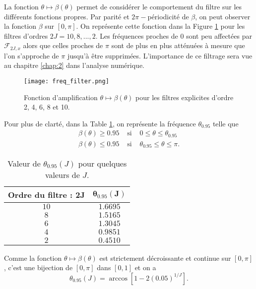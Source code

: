 La fonction $\theta \mapsto \beta(\theta)$ permet de considérer le comportement du filtre sur les différents fonctions propres. Par parité et $2 \pi -$périodicité de $\beta$, on peut observer la fonction $\beta$ sur $[0,\pi]$. On représente cette fonction dans la Figure \ref{fig:freq_filter} pour les filtres d'ordres $2J = 10, 8, ..., 2$. Les fréquences proches de 0 sont peu affectées par $\mathcal{F}_{2J,x}$ alors que celles proches de $\pi$ sont de plus en plus atténuées à mesure que l'on s'approche de $\pi$ jusqu'à être supprimées. L'importance de ce filtrage sera vue au chapitre \ref{chap:2} dans l'analyse numérique.

\begin{figure}[htbp]
\begin{center}
\texttt{[image: freq\_filter.png]}
\end{center}
\caption{Fonction d'amplification $\theta \mapsto \beta(\theta)$ pour les filtres explicites d'ordre 2, 4, 6, 8 et 10.}
\label{fig:freq_filter}
\end{figure}
Pour plus de clarté, dans la Table \ref{tab:filter_095}, on représente la fréquence $\theta_{0.95}$ telle que
\begin{equation}
\begin{array}{rcl}
\beta(\theta) \geq 0.95 & \text{ si } & 0 \leq \theta \leq \theta_{0.95} \\
\beta(\theta) \leq 0.95 & \text{ si } & \theta_{0.95} \leq \theta \leq \pi.
\end{array}
\end{equation}

\begin{table}
\begin{center}
\begin{tabular}{|c||c|}
\hline
\textbf{Ordre du filtre : }$\mathbf{2J}$ & $\mathbf{\theta_{0.95}(J)}$\\
\hline
\hline
$10$&$1.6695$\\
$8$&$1.5165$\\
$6$&$1.3045$\\
$4$&$0.9851$\\
$2$&$0.4510$\\
\hline
\end{tabular}
\end{center}
\caption{Valeur de $\theta_{0.95}(J)$ pour quelques valeurs de $J$.}
\label{tab:filter_095}
\end{table}

Comme la fonction $\theta \mapsto \beta(\theta)$ est strictement décroissante et continue sur $[0,\pi]$, c'est une bijection de $[0,\pi]$ dans $[0,1]$ et on a 
\begin{equation}
\theta_{0.95}(J) = \arccos \left[ 1-2 (0.05)^{1/J} \right].
\end{equation}


